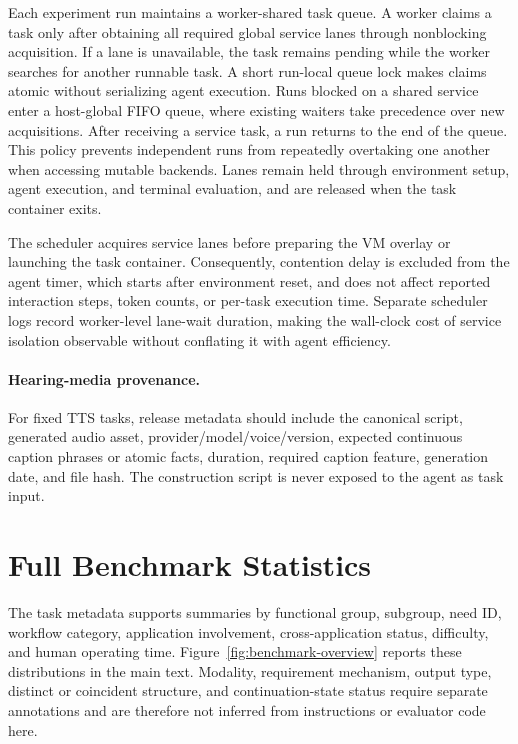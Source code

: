 \documentclass[11pt]{article}
\begin{document}
Each experiment run maintains a worker-shared task queue. A worker claims a task only after obtaining all required global service lanes through nonblocking acquisition. If a lane is unavailable, the task remains pending while the worker searches for another runnable task. A short run-local queue lock makes claims atomic without serializing agent execution. Runs blocked on a shared service enter a host-global FIFO queue, where existing waiters take precedence over new acquisitions. After receiving a service task, a run returns to the end of the queue. This policy prevents independent runs from repeatedly overtaking one another when accessing mutable backends. Lanes remain held through environment setup, agent execution, and terminal evaluation, and are released when the task container exits.

The scheduler acquires service lanes before preparing the VM overlay or launching the task container. Consequently, contention delay is excluded from the agent timer, which starts after environment reset, and does not affect reported interaction steps, token counts, or per-task execution time. Separate scheduler logs record worker-level lane-wait duration, making the wall-clock cost of service isolation observable without conflating it with agent efficiency.

\paragraph{Hearing-media provenance.}
For fixed TTS tasks, release metadata should include the canonical script, generated audio asset, provider/model/voice/version, expected continuous caption phrases or atomic facts, duration, required caption feature, generation date, and file hash. The construction script is never exposed to the agent as task input.

\section{Full Benchmark Statistics}
\label{app:statistics}

The task metadata supports summaries by functional group, subgroup, need ID, workflow category, application involvement, cross-application status, difficulty, and human operating time. Figure~\ref{fig:benchmark-overview} reports these distributions in the main text. Modality, requirement mechanism, output type, distinct or coincident structure, and continuation-state status require separate annotations and are therefore not inferred from instructions or evaluator code here.
\end{document}
